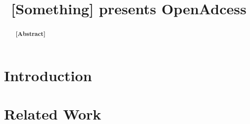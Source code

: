 \documentclass[sigtbd]{sigtbd17-style}
\newcommand{\todo}[1]
{{\bf\color{red}[#1]}}
\begin{document}
\title{\todo{Something} presents OpenAdcess}
\maketitle

\begin{abstract}
  \todo{Abstract}
\end{abstract}

\section{Introduction}

\section{Related Work}






\end{document}
